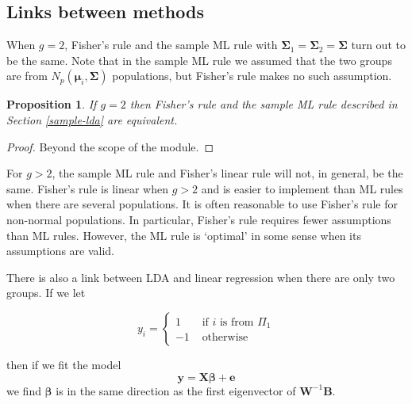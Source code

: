 \documentclass[
]{book}
\newtheorem{proposition}{Proposition}[chapter]
\theoremstyle{definition}
\theoremstyle{definition}
\theoremstyle{definition}
\theoremstyle{definition}
\theoremstyle{remark}
\begin{document}
\hypertarget{links-between-methods}{%
\subsection{Links between methods}\label{links-between-methods}}

When \(g=2\), Fisher's rule and the sample ML rule with \(\boldsymbol{\Sigma}_1=\boldsymbol{\Sigma}_2=\boldsymbol{\Sigma}\) turn out to be the same. Note that in
the sample ML rule we assumed that the two groups are from \(N_p({\boldsymbol{\mu}}_i, \boldsymbol{\Sigma})\)
populations, but Fisher's rule makes no such assumption.

\begin{proposition}
\protect\hypertarget{prp:nine3}{}\label{prp:nine3}If \(g=2\) then Fisher's rule and the sample ML rule described in Section \ref{sample-lda} are equivalent.
\end{proposition}

\begin{proof}
Beyond the scope of the module.
\end{proof}

For \(g > 2\), the sample ML rule and Fisher's linear rule will not, in general, be the same. Fisher's rule is linear when \(g>2\) and is easier to implement than ML rules when there are several populations. It is often reasonable to use Fisher's rule for non-normal populations. In particular, Fisher's rule requires fewer assumptions than ML rules. However, the ML rule is `optimal' in some sense when its assumptions are valid.

There is also a link between LDA and linear regression when there are only two groups. If we let

\[
y_i = \begin{cases} 1 &\mbox{ if }i \mbox{ is from } \Pi_1\\
-1 &\mbox{ otherwise}
\end{cases}
\]

then if we fit the model
\[\mathbf y= \mathbf X\boldsymbol \beta+ \mathbf e\]
we find \(\boldsymbol \beta\) is in the same direction as the first eigenvector of \(\mathbf W^{-1}\mathbf B\).
\end{document}
